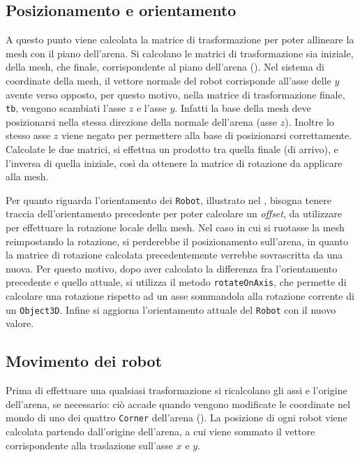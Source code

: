 \documentclass[12pt,a4paper,openright,oneside]{book}
\begin{document}
\subsection{Posizionamento e orientamento}\label{sub:posizionamento_e_orientamento} %
A questo punto viene calcolata la matrice di trasformazione per poter allineare la mesh con il piano dell'arena. Si calcolano le matrici di trasformazione sia iniziale, della mesh, che finale, corrispondente al piano dell'arena ().
Nel sistema di coordinate della mesh, il vettore normale del robot corrisponde all'asse delle $y$ avente verso opposto, per questo motivo, nella matrice di trasformazione finale, \texttt{tb}, vengono scambiati l'asse $z$ e l'asse $y$. Infatti la base della mesh deve posizionarsi nella stessa direzione della normale dell'arena (asse $z$). Inoltre lo stesso asse $z$ viene negato per permettere alla base di posizionarsi correttamente.
Calcolate le due matrici, si effettua un prodotto tra quella finale (di arrivo), e l'inversa di quella iniziale, così da ottenere la matrice di rotazione da applicare alla mesh.

%
Per quanto riguarda l'orientamento dei \texttt{Robot}, illustrato nel , bisogna tenere traccia dell'orientamento precedente per poter calcolare un \textit{offset}, da utilizzare per effettuare la rotazione locale della mesh.
Nel caso in cui si ruotasse la mesh reimpostando la rotazione, si perderebbe il posizionamento sull'arena, in quanto la matrice di rotazione calcolata precedentemente verrebbe sovrascritta da una nuova.
Per questo motivo, dopo aver calcolato la differenza fra l'orientamento precedente e quello attuale, si utilizza il metodo \texttt{rotateOnAxis}, che permette di calcolare una rotazione rispetto ad un asse sommandola alla rotazione corrente di un \texttt{Object3D}. Infine si aggiorna l'orientamento attuale del \texttt{Robot} con il nuovo valore.


\subsection{Movimento dei robot}\label{sub:impl_movimento_dei_robot} %
Prima di effettuare una qualsiasi trasformazione si ricalcolano gli assi e l'origine dell'arena, se necessario: ciò accade quando vengono modificate le coordinate nel mondo di uno dei quattro \texttt{Corner} dell'arena ().
La posizione di ogni robot viene calcolata partendo dall'origine dell'arena, a cui viene sommato il vettore corrispondente alla traslazione sull'asse $x$ e $y$.

%
%
%
\end{document}
